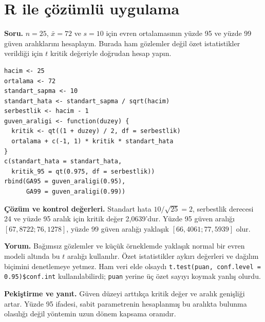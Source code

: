 \section{R ile çözümlü uygulama}
\label{sec:r-b08}

\textbf{Soru.} $n=25$, $\bar x=72$ ve $s=10$ için evren ortalamasının
yüzde 95 ve yüzde 99 güven aralıklarını hesaplayın. Burada ham gözlemler
değil özet istatistikler verildiği için $t$ kritik değeriyle doğrudan hesap yapın.

\begin{lstlisting}[style=prismR]
hacim <- 25
ortalama <- 72
standart_sapma <- 10
standart_hata <- standart_sapma / sqrt(hacim)
serbestlik <- hacim - 1
guven_araligi <- function(duzey) {
  kritik <- qt((1 + duzey) / 2, df = serbestlik)
  ortalama + c(-1, 1) * kritik * standart_hata
}
c(standart_hata = standart_hata,
  kritik_95 = qt(0.975, df = serbestlik))
rbind(GA95 = guven_araligi(0.95),
      GA99 = guven_araligi(0.99))
\end{lstlisting}

\begin{outputguidebox}
\textbf{Çözüm ve kontrol değerleri.} Standart hata $10/\sqrt{25}=2$,
serbestlik derecesi 24 ve yüzde 95 aralık için kritik değer 2,0639'dur.
Yüzde 95 güven aralığı $[67{,}8722;76{,}1278]$, yüzde 99 güven aralığı
yaklaşık $[66{,}4061;77{,}5939]$ olur.
\end{outputguidebox}

\textbf{Yorum.} Bağımsız gözlemler ve küçük örneklemde yaklaşık normal
bir evren modeli altında bu $t$ aralığı kullanılır. Özet istatistikler aykırı
değerleri ve dağılım biçimini denetlemeye yetmez. Ham veri elde olsaydı
\texttt{t.test(puan, conf.level = 0.95)\$conf.int} kullanılabilirdi;
\texttt{puan} yerine üç özet sayıyı koymak yanlış olurdu.

\textbf{Pekiştirme ve yanıt.} Güven düzeyi arttıkça kritik değer ve aralık
genişliği artar. Yüzde 95 ifadesi, sabit parametrenin hesaplanmış bu aralıkta
bulunma olasılığı değil yöntemin uzun dönem kapsama oranıdır.